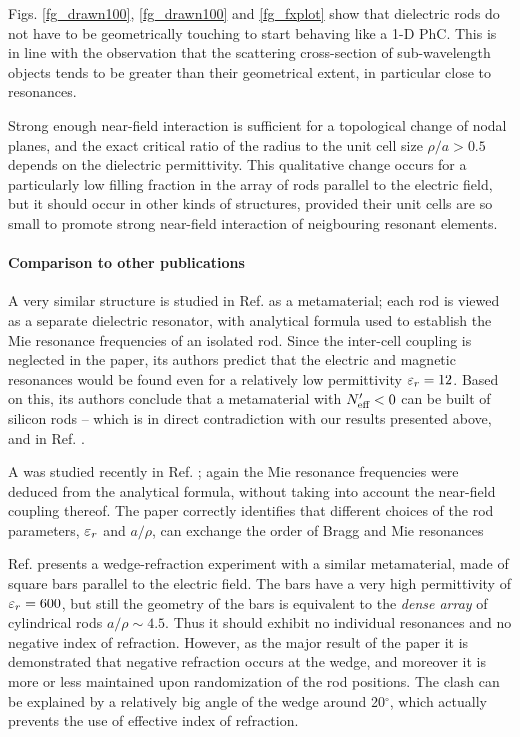 Figs. \ref{fg_drawn100}, \ref{fg_drawn100} and \ref{fg_fxplot} show that dielectric rods do not have to be geometrically touching to start behaving like a 1-D PhC. This is in line with the observation that the scattering cross-section of sub-wavelength objects tends to be greater than their geometrical extent, in particular close to resonances.

Strong enough near-field interaction is sufficient for a topological change of nodal planes, and the exact critical ratio of the radius to the unit cell size $\rho/a > 0.5$ depends on the dielectric permittivity. This qualitative change occurs for a particularly low filling fraction in the array of rods parallel to the electric field, but it should occur in other kinds of structures, provided their unit cells are so small to promote strong near-field interaction of neigbouring resonant elements.

\paragraph{Comparison to other publications} %
A very similar structure  is studied in Ref. \cite{vynck2009all} as a metamaterial; each rod is viewed as a separate dielectric resonator, with analytical formula used to establish the Mie resonance frequencies of an isolated rod. Since the inter-cell coupling is neglected in the paper, its authors predict that the electric and magnetic resonances would be found even for a relatively low permittivity $\varepsilon_r = 12$. Based on this, its authors conclude that a metamaterial with $N_{\text{eff} }'<0$ can be built of silicon rods -- which is in direct contradiction with our results presented above, and in Ref. \cite{dominec2014transition}.

A was studied recently in Ref. \cite{rybin2014photonic}; again the Mie resonance frequencies were deduced from the analytical formula, without taking into account the near-field coupling thereof. The paper correctly identifies that different choices of the rod parameters, $\varepsilon_r$ and $a/\rho$, can exchange the order of Bragg and Mie resonances 


Ref. \cite{peng2007} presents a wedge-refraction experiment with a similar metamaterial, made of square bars parallel to the electric field. The bars have a very high permittivity of $\varepsilon_r=600$, but still the geometry of the bars is equivalent to the \textit{dense array} of cylindrical rods $a/\rho \sim 4.5$. Thus it should exhibit no individual resonances and no negative index of refraction. However, as the major result of the paper \cite[Fig. 3bc]{peng2007} it is demonstrated that negative refraction occurs at the wedge, and moreover it is more or less maintained upon randomization of the rod positions.
The clash can be explained by a relatively big angle of the wedge around 20$^\circ$, which actually prevents the use of effective index of refraction. %

